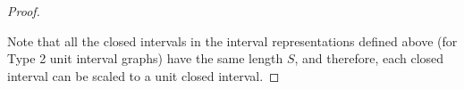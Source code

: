 \documentclass[10pt,a4paper]{amsart}
\newcommand{\TT}{TCC(a_1,a_2,\dots,a_s)}
\newcommand{\T}{TCC(a_1,a_2,\dots,a_{s-1})}
\begin{document}
\begin{proof}
\begin{center}
\end{center}



     



Note that all the closed intervals in the interval representations defined above (for Type 2 unit interval graphs) have the same length $S$, and therefore, each closed interval can be scaled to a unit closed interval.





\end{proof}
\end{document}
